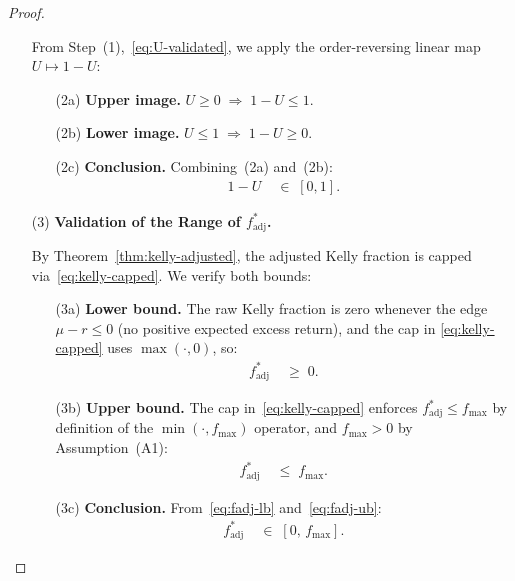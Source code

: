 \documentclass[12pt,openany]{book}
\numberwithin{equation}{chapter}
\theoremstyle{plain}
\theoremstyle{definition}
\theoremstyle{remark}
\numberwithin{equation}{chapter}
\theoremstyle{plain}
\begin{document}
\begin{proof}
\begin{enumerate}
        From Step~(1),~\eqref{eq:U-validated}, we apply the
        order-reversing linear map $U \mapsto 1-U$:
        \begin{enumerate}
          \item[\textup{(2a)}] \textbf{Upper image.}
                $U \geq 0 \;\Rightarrow\; 1 - U \leq 1$.
          \item[\textup{(2b)}] \textbf{Lower image.}
                $U \leq 1 \;\Rightarrow\; 1 - U \geq 0$.
          \item[\textup{(2c)}] \textbf{Conclusion.}
                Combining~\textup{(2a)} and~\textup{(2b)}:
                \begin{align}
                  1 - U &\;\in\; [0,1].
                  \label{eq:one-minus-U}
                \end{align}
        \end{enumerate}

  \item[\textup{(3)}] \textbf{Validation of the Range of
        $f^*_{\mathrm{adj}}$.}

        By Theorem~\ref{thm:kelly-adjusted}, the adjusted Kelly
        fraction is capped via~\eqref{eq:kelly-capped}.  We
        verify both bounds:
        \begin{enumerate}
          \item[\textup{(3a)}] \textbf{Lower bound.}
                The raw Kelly fraction is zero whenever the
                edge $\mu - r \leq 0$ (no positive expected
                excess return), and the cap in
                \eqref{eq:kelly-capped} uses
                $\max(\cdot, 0)$, so:
                \begin{align}
                  f^*_{\mathrm{adj}} &\;\geq\; 0.
                  \label{eq:fadj-lb}
                \end{align}
          \item[\textup{(3b)}] \textbf{Upper bound.}
                The cap in~\eqref{eq:kelly-capped} enforces
                $f^*_{\mathrm{adj}} \leq f_{\max}$ by
                definition of the $\min(\cdot, f_{\max})$
                operator, and $f_{\max} > 0$ by
                Assumption~\textup{(A1)}:
                \begin{align}
                  f^*_{\mathrm{adj}} &\;\leq\; f_{\max}.
                  \label{eq:fadj-ub}
                \end{align}
          \item[\textup{(3c)}] \textbf{Conclusion.}
                From~\eqref{eq:fadj-lb} and~\eqref{eq:fadj-ub}:
                \begin{align}
                  f^*_{\mathrm{adj}} &\;\in\; [0,\, f_{\max}].
                  \label{eq:fadj-range}
                \end{align}
        \end{enumerate}


\end{enumerate}
\end{proof}
\end{document}

